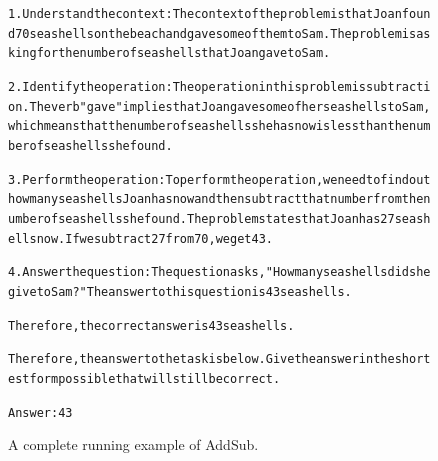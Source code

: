 \begin{figure}[htbp]
{{\begin{alltt}
1. Understand the context: The context of the problem is that Joan found 70 seashells on the beach and gave some of them to Sam. The problem is asking for the number of seashells that Joan gave to Sam.

2. Identify the operation: The operation in this problem is subtraction. The verb "gave" implies that Joan gave some of her seashells to Sam, which means that the number of seashells she has now is less than the number of seashells she found.

3. Perform the operation: To perform the operation, we need to find out how many seashells Joan has now and then subtract that number from the number of seashells she found. The problem states that Joan has 27 seashells now. If we subtract 27 from 70, we get 43.

4. Answer the question: The question asks, "How many seashells did she give to Sam?" The answer to this question is 43 seashells.

Therefore, the correct answer is 43 seashells.

Therefore, the answer to the task is below. Give the answer in the shortest form possible that will still be correct.

Answer: 43
\end{alltt}
}}
\caption{A complete running example of AddSub.}
\label{fig:addsub_example}
\end{figure}
